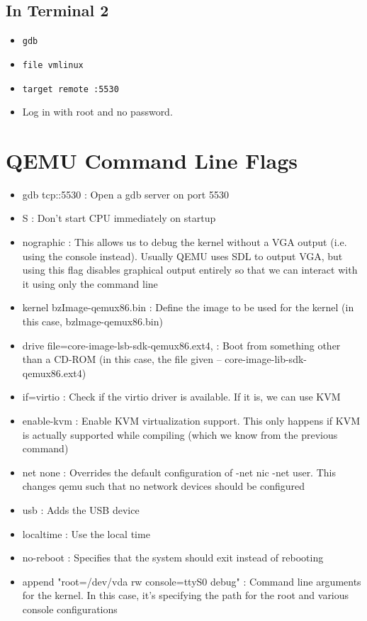 \documentclass[letterpaper,10pt,titlepage]{article}
\begin{document}
\subsection{In Terminal 2}
\begin{itemize}
   \item \verb|gdb|
   \item \verb|file vmlinux|
   \item \verb|target remote :5530|
   \item Log in with root and no password.
\end{itemize}



\section{QEMU Command Line Flags}

\begin{itemize}
   \item gdb tcp::5530 : Open a gdb server on port 5530
   \item S : Don’t start CPU immediately on startup
   \item nographic : This allows us to debug the kernel without a VGA output (i.e. using the console instead). Usually QEMU uses SDL to output VGA, but using this flag disables graphical output entirely so that we can interact with it using only the command line
   \item kernel bzImage-qemux86.bin : Define the image to be used for the kernel (in this case,  bzlmage-qemux86.bin)
   \item drive file=core-image-lsb-sdk-qemux86.ext4, : Boot from something other than a CD-ROM (in this case, the file given – core-image-lib-sdk-qemux86.ext4)
   \item if=virtio : Check if the virtio driver is available. If it is, we can use KVM
   \item enable-kvm :  Enable KVM virtualization support. This only happens if KVM is actually supported while compiling (which we know from the previous command)
   \item net none : Overrides the default configuration of -net nic -net user. This changes qemu such that no network devices should be configured
   \item usb : Adds the USB device
   \item localtime : Use the local time
   \item no-reboot : Specifies that the system should exit instead of rebooting
   \item append "root=/dev/vda rw console=ttyS0 debug" : Command line arguments for the kernel. In this case, it’s specifying the path for the root and various console configurations
\end{itemize}
\end{document}
